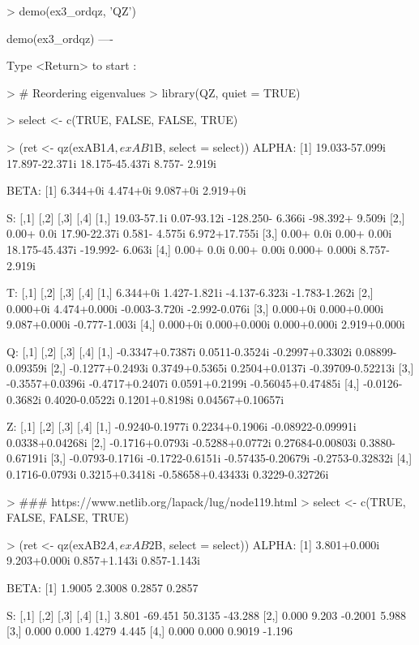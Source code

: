 \begin{Code}[title=QZ demo ex3\_ordqz]
> demo(ex3_ordqz, 'QZ')


	demo(ex3_ordqz)
	---- ~~~~~~~~~

Type  <Return>	 to start : 

> # Reordering eigenvalues
> library(QZ, quiet = TRUE)

> select <- c(TRUE, FALSE, FALSE, TRUE)

> (ret <- qz(exAB1$A, exAB1$B, select = select))
ALPHA:
[1] 19.033-57.099i 17.897-22.371i 18.175-45.437i  8.757- 2.919i

BETA:
[1] 6.344+0i 4.474+0i 9.087+0i 2.919+0i

S:
            [,1]         [,2]             [,3]            [,4]
[1,] 19.03-57.1i  0.07-93.12i -128.250- 6.366i -98.392+ 9.509i
[2,]  0.00+ 0.0i 17.90-22.37i    0.581- 4.575i   6.972+17.755i
[3,]  0.00+ 0.0i  0.00+ 0.00i   18.175-45.437i -19.992- 6.063i
[4,]  0.00+ 0.0i  0.00+ 0.00i    0.000+ 0.000i   8.757- 2.919i

T:
         [,1]         [,2]          [,3]          [,4]
[1,] 6.344+0i 1.427-1.821i -4.137-6.323i -1.783-1.262i
[2,] 0.000+0i 4.474+0.000i -0.003-3.720i -2.992-0.076i
[3,] 0.000+0i 0.000+0.000i  9.087+0.000i -0.777-1.003i
[4,] 0.000+0i 0.000+0.000i  0.000+0.000i  2.919+0.000i

Q:
                [,1]            [,2]            [,3]              [,4]
[1,] -0.3347+0.7387i  0.0511-0.3524i -0.2997+0.3302i  0.08899-0.09359i
[2,] -0.1277+0.2493i  0.3749+0.5365i  0.2504+0.0137i -0.39709-0.52213i
[3,] -0.3557+0.0396i -0.4717+0.2407i  0.0591+0.2199i -0.56045+0.47485i
[4,] -0.0126-0.3682i  0.4020-0.0522i  0.1201+0.8198i  0.04567+0.10657i

Z:
                [,1]            [,2]              [,3]             [,4]
[1,] -0.9240-0.1977i  0.2234+0.1906i -0.08922-0.09991i  0.0338+0.04268i
[2,] -0.1716+0.0793i -0.5288+0.0772i  0.27684-0.00803i  0.3880-0.67191i
[3,] -0.0793-0.1716i -0.1722-0.6151i -0.57435-0.20679i -0.2753-0.32832i
[4,]  0.1716-0.0793i  0.3215+0.3418i -0.58658+0.43433i  0.3229-0.32726i

> ### https://www.netlib.org/lapack/lug/node119.html
> select <- c(TRUE, FALSE, FALSE, TRUE)

> (ret <- qz(exAB2$A, exAB2$B, select = select))
ALPHA:
[1] 3.801+0.000i 9.203+0.000i 0.857+1.143i 0.857-1.143i

BETA:
[1] 1.9005 2.3008 0.2857 0.2857

S:
      [,1]    [,2]    [,3]    [,4]
[1,] 3.801 -69.451 50.3135 -43.288
[2,] 0.000   9.203 -0.2001   5.988
[3,] 0.000   0.000  1.4279   4.445
[4,] 0.000   0.000  0.9019  -1.196


\end{Code}
